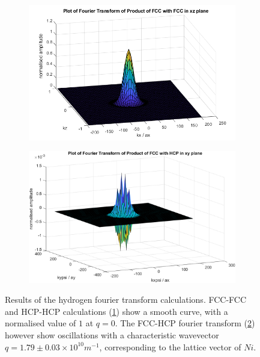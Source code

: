 \begin{figure}[htbp]
    \captionsetup[subfigure]{justification=centering}
    \centering
    \begin{subfigure}{0.45\linewidth}
        \centering
        \includegraphics[width= 0.9\linewidth]{Figures/Model/Plot of fourier transform of the wavefunction fccfcc xz plane.png}
        \label{fig:diagonal hydrogen matrix element no oscillation}
    \end{subfigure}
    \hfill
    \begin{subfigure}{0.45\linewidth}
        \centering
        \includegraphics[width= 0.9\linewidth]{Figures/Model/Plot of fourier transform of the wavefunction.png}
        \label{fig:cross hydrogen matrix element oscillation}
    \end{subfigure}
    \caption{Results of the hydrogen fourier transform calculations.
    FCC-FCC and HCP-HCP calculations
    (\cref{fig:diagonal hydrogen matrix element no oscillation})
    show a smooth curve, with a normalised
    value of \(1\) at \(q=0\).
    The FCC-HCP fourier transform
    (\cref{fig:cross hydrogen matrix element oscillation})
    however show oscillations with a characteristic
    wavevector \(q = 1.79 \pm 0.03 \times{}10^{10}m^{-1}\),
    corresponding to the lattice vector of \(Ni\).
    }\label{fig:fourier transform oscillation}
\end{figure}
